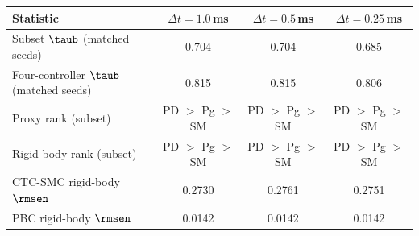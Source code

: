 \begin{tabular}{lccc}
\toprule
Statistic & $\Delta t = 1.0$\,ms & $\Delta t = 0.5$\,ms & $\Delta t = 0.25$\,ms \\
\midrule
Subset $\taub$ (matched seeds) & 0.704 & 0.704 & 0.685 \\
Four-controller $\taub$ (matched seeds) & 0.815 & 0.815 & 0.806 \\
Proxy rank (subset) & PD $>$ Pg $>$ SM & PD $>$ Pg $>$ SM & PD $>$ Pg $>$ SM \\
Rigid-body rank (subset) & PD $>$ Pg $>$ SM & PD $>$ Pg $>$ SM & PD $>$ Pg $>$ SM \\
\midrule
CTC-SMC rigid-body $\rmsen$ & 0.2730 & 0.2761 & 0.2751 \\
PBC rigid-body $\rmsen$ & 0.0142 & 0.0142 & 0.0142 \\
\bottomrule
\end{tabular}
